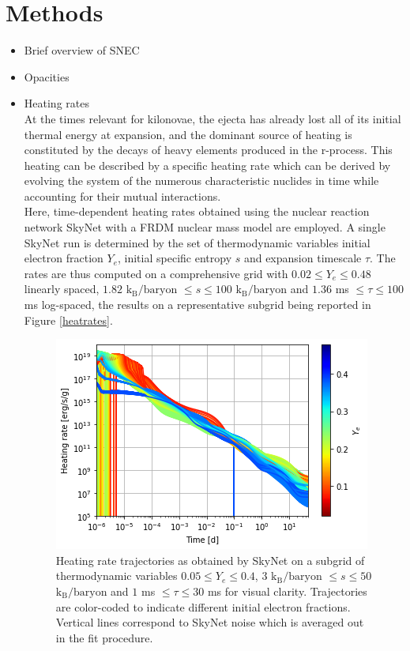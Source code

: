 \documentclass[fleqn,usenatbib]{mnras}
\begin{document}
\section{Methods}
\begin{itemize}
    \item Brief overview of SNEC
    \item Opacities
    \item Heating rates\\
    At the times relevant for kilonovae, the ejecta has already lost all of its initial thermal energy at expansion, and the dominant source of heating is constituted by the decays of heavy elements produced in the r-process. This heating can be described by a specific heating rate which can be derived by evolving the system of the numerous characteristic nuclides in time while accounting for their mutual interactions.\\
    Here, time-dependent heating rates obtained using the nuclear reaction network SkyNet with a FRDM nuclear mass model are employed. A single SkyNet run is determined by the set of thermodynamic variables initial electron fraction $Y_e$, initial specific entropy $s$ and expansion timescale $\tau$. The rates are thus computed on a comprehensive grid with $0.02\leq Y_e\leq0.48$ linearly spaced, $1.82$ $\mathrm{k_B/baryon}$ $\leq s\leq100$ $\mathrm{k_B/baryon}$ and $1.36$ ms $\leq\tau\leq100$ ms log-spaced, the results on a representative subgrid being reported in Figure \ref{heatrates}.\\
    \begin{figure}
    \centering
    \includegraphics[scale=0.65]{heatrates.png}
    \caption{Heating rate trajectories as obtained by SkyNet on a subgrid of thermodynamic variables $0.05\leq Y_e\leq0.4$, $3$ $\mathrm{k_B/baryon}$ $\leq s\leq50$ $\mathrm{k_B/baryon}$ and $1$ ms $\leq\tau\leq30$ ms for visual clarity. Trajectories are color-coded to indicate different initial electron fractions. Vertical lines correspond to SkyNet noise which is averaged out in the fit procedure.}

\end{figure}
\end{itemize}
\end{document}
